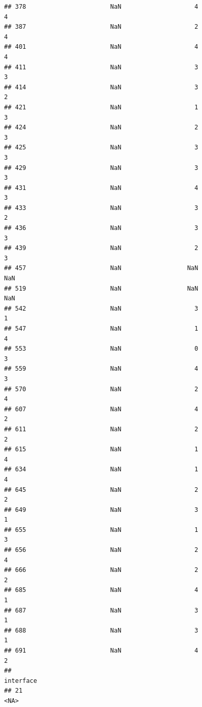 \documentclass[
]{article}
\begin{document}
\begin{verbatim}
## 378                       NaN                    4                    4
## 387                       NaN                    2                    4
## 401                       NaN                    4                    4
## 411                       NaN                    3                    3
## 414                       NaN                    3                    2
## 421                       NaN                    1                    3
## 424                       NaN                    2                    3
## 425                       NaN                    3                    3
## 429                       NaN                    3                    3
## 431                       NaN                    4                    3
## 433                       NaN                    3                    2
## 436                       NaN                    3                    3
## 439                       NaN                    2                    3
## 457                       NaN                  NaN                  NaN
## 519                       NaN                  NaN                  NaN
## 542                       NaN                    3                    1
## 547                       NaN                    1                    4
## 553                       NaN                    0                    3
## 559                       NaN                    4                    3
## 570                       NaN                    2                    4
## 607                       NaN                    4                    2
## 611                       NaN                    2                    2
## 615                       NaN                    1                    4
## 634                       NaN                    1                    4
## 645                       NaN                    2                    2
## 649                       NaN                    3                    1
## 655                       NaN                    1                    3
## 656                       NaN                    2                    4
## 666                       NaN                    2                    2
## 685                       NaN                    4                    1
## 687                       NaN                    3                    1
## 688                       NaN                    3                    1
## 691                       NaN                    4                    2
##                                                              interface
## 21                                                                <NA>

\end{verbatim}
\end{document}
